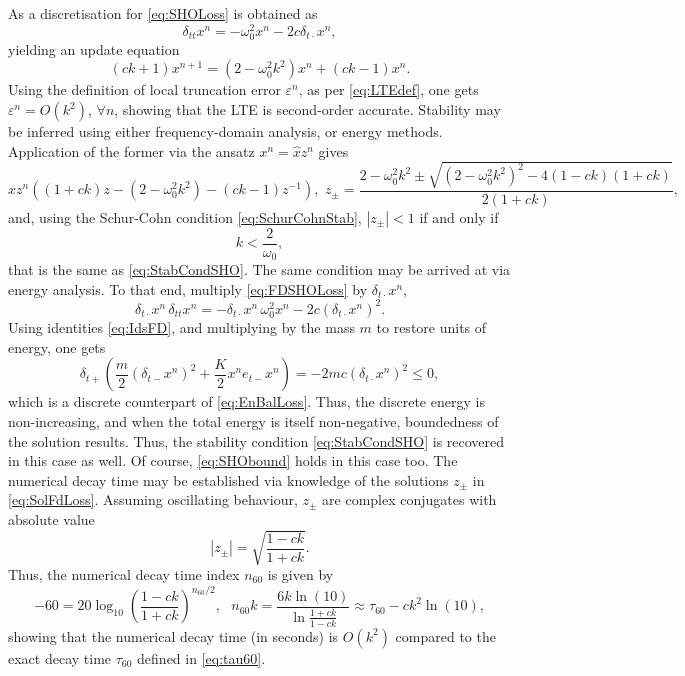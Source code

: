 \documentclass[11pt,twoside,a4paper,english]{book}
\newcommand{\etm}{e_{t-}}
\newcommand{\dtp}{\delta_{t+}}
\newcommand{\dtm}{\delta_{t-}}
\newcommand{\dtd}{\delta_{t\cdot}}
\newcommand{\dtt}{\delta_{tt}}
\begin{document}
As a discretisation for \eqref{eq:SHOLoss} is obtained as
\begin{equation}\label{eq:FDSHOLoss}
    \dtt x^n = -\omega_0^2 x^n -2c \dtd x^n,
\end{equation}
yielding an update equation
\begin{equation}
    \left(ck+1\right) x^{n+1} = (2-\omega_0^2 k^2) x^n + (ck - 1)x^n.
\end{equation}
Using the definition of local truncation error $\varepsilon^n$, as per \eqref{eq:LTEdef}, one gets $\varepsilon^n = O(k^2)$, $\forall n$, showing that the LTE is second-order accurate. Stability may be inferred using either frequency-domain analysis, or energy methods. Application of the former via the ansatz $x^n = \hat x z^n$ gives
\begin{equation}\label{eq:SolFdLoss}
    \hat x z^n \left((1+ck)z - (2-\omega_0^2 k^2) -(ck-1)z^{-1}\right), \,\, z_\pm = \frac{2-\omega_0^2k^2 \pm \sqrt{(2-\omega_0^2k^2)^2 - 4(1-ck)(1+ck)}}{2(1+ck)},
\end{equation}
and, using the Schur-Cohn condition \eqref{eq:SchurCohnStab}, $|z_\pm|<1$ if and only if
\begin{equation}
    k < \frac{2}{\omega_0},
\end{equation}
that is the same as \eqref{eq:StabCondSHO}. The same condition may be arrived at via energy analysis. To that end, multiply \eqref{eq:FDSHOLoss} by $\dtd x^n$, 
\begin{equation}
    \dtd x^n \, \dtt x^n = - \dtd x^n \, \omega_0^2 x^n - 2c (\dtd x^n)^2.
\end{equation}
Using identities \eqref{eq:IdsFD}, and multiplying by the mass $m$ to restore units of energy, one gets
\begin{equation}
    \dtp \left( \frac{m}{2}{(\dtm x^n)^2} + \frac{K}{2} {x^n \etm x^n} \right) = - 2mc (\dtd x^n)^2 \leq 0,
\end{equation}
which is a discrete counterpart of \eqref{eq:EnBalLoss}. Thus, the discrete energy is non-increasing, and when the total energy is itself non-negative, boundedness of the solution results. Thus, the stability condition \eqref{eq:StabCondSHO} is recovered in this case as well. Of course, \eqref{eq:SHObound}  holds in this case too. The numerical decay time may be established via knowledge of the solutions $z_\pm$ in \eqref{eq:SolFdLoss}. Assuming oscillating behaviour, $z_\pm$ are complex conjugates with absolute value
\begin{equation}
    |z_\pm| = \sqrt{\frac{1-ck}{1+ck}}.
\end{equation}
Thus, the numerical decay time index $n_{60}$ is given by
\begin{equation}
    -60 = 20\log_{10}\left({\frac{1-ck}{1+ck}}\right)^{n_{60}/2},\,\,\,\, n_{60}k = \frac{6k \ln(10)}{\ln \frac{1+ck}{1-ck}}\approx \tau_{60} - c k^2 \ln(10),
\end{equation}
showing that the numerical decay time (in seconds) is $O(k^2)$ compared to the exact decay time $\tau_{60}$ defined in \eqref{eq:tau60}.
\end{document}
